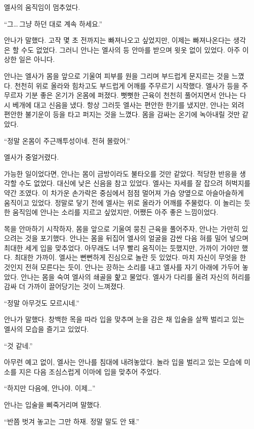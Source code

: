 엘사의 움직임이 멈추었다.

``그\ldots\,그냥 하던 대로 계속 하세요.''

안나가 말했다. 고작 몇 초 전까지는 빠져나오고 싶었지만, 이제는 빠져나온다는 생각은 할 수도 없었다. 그러니 안나는 엘사의 등 안마를 받으며 윗옷 없이 있었다. 아주 이상한 일은 아니다.

안나는 엘사가 몸을 앞으로 기울여 피부를 원을 그리며 부드럽게 문지르는 것을 느꼈다. 천천히 위로 올라와 힘차고도 부드럽게 어깨를 주무르기 시작했다. 엘사가 등을 주무르자 기분 좋은 온기가 온몸에 퍼졌다. 뻣뻣한 근육이 천천히 풀어지면서 안나는 다시 베개에 대고 신음을 냈다. 항상 그러듯 엘사는 편안한 한기를 냈지만, 안나는 외려 편안한 불기운이 등을 타고 퍼지는 것을 느꼈다. 몸을 감싸는 온기에 녹아내릴 것만 같았다.

``정말 온몸이 주근깨투성이네. 전혀 몰랐어.''

엘사가 중얼거렸다.

가능한 일이었다면, 안나는 몸이 금방이라도 불타오를 것만 같았다. 적당한 반응을 생각할 수도 없었다. 대신에 낮은 신음을 참고 있었다. 엘사는 자세를 잘 잡으려 허벅지를 약간 조였다. 이 차가운 손가락은 중심에서 점점 멀어져 가슴 양옆으로 아슬아슬하게 움직이고 있었다. 정말로 닿기 전에 엘사는 위로 올라가 어깨를 주물렀다. 이 놀리는 듯한 움직임에 안나는 소리를 지르고 싶었지만, 어쨌든 아주 좋은 느낌이었다.

목을 안마하기 시작하자, 몸을 앞으로 기울여 뭉친 근육을 풀어주자, 안나는 가만히 있으려는 것을 포기했다. 안나는 몸을 뒤집어 엘사의 얼굴을 감싼 다음 혀를 밀어 넣으며 최대한 세게 입을 맞추었다. 아무래도 너무 빨리 움직이는 듯했지만, 가까이 가야만 했다. 최대한 가까이. 엘사는 뻔뻔하게 진심으로 놀란 듯 있었다. 마치 자신이 무엇을 한 것인지 전혀 모른다는 듯이. 안나는 끙하는 소리를 내고 엘사를 자기 아래에 가두어 놓았다. 안나는 몸을 숙여 엘사의 쇄골을 핥고 물었다. 엘사가 다리를 올려 자신의 허리를 감싸 더 가까이 끌어당기는 것이 느껴졌다.

``정말 아무것도 모르시네.''

안나가 말했다. 창백한 목을 따라 입을 맞추며 눈을 감은 채 입술을 살짝 벌리고 있는 엘사의 모습을 즐기고 있었다.

`` 것 같네.''

아무런 예고 없이, 엘사는 안나를 침대에 내려놓았다. 놀라 입을 벌리고 있는 모습에 미소를 지은 다음 조심스럽게 이마에 입을 맞추어 주었다.

``하지만 다음에, 안나야. 이제\ldots''

안나는 입술을 삐죽거리며 말했다.

``반쯤 벗겨 놓고는 그만 하재. 정말 말도 안 돼.''

